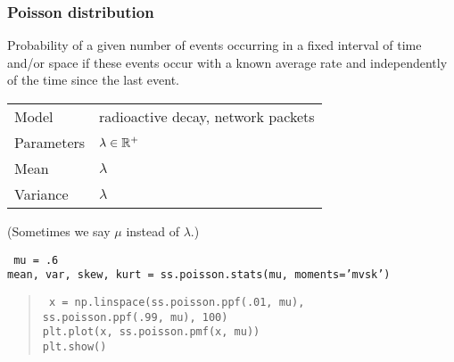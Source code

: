 \begin{frame}
  \frametitle{Poisson distribution}

  Probability of a given number of events occurring in a fixed
  interval of time and/or space if these events occur with a known
  average rate and independently of the time since the last event.
  \bigskip
  
  \begin{tabular}{l|l}
    Model & radioactive decay, network packets\\[1mm]
    Parameters & $\lambda\in \mathbb{R}^+$\\[1mm]
    Mean & $\lambda$\\[1mm]
    Variance & $\lambda$
  \end{tabular}

  \vspace{6mm}
   { (Sometimes we say $\mu$ instead of $\lambda$.) }

   {
    \tt
    mu = .6\\
    mean, var, skew, kurt = ss.poisson.stats(mu, moments='mvsk')

  }
   {
    \begin{quote}
      \tt
      x = np.linspace(ss.poisson.ppf(.01, mu), \\
      \hspace{1cm} ss.poisson.ppf(.99, mu), 100) \\
      plt.plot(x, ss.poisson.pmf(x, mu)) \\
      plt.show()
    \end{quote}

    \cnote {  }
  }

  
  
\end{frame}

